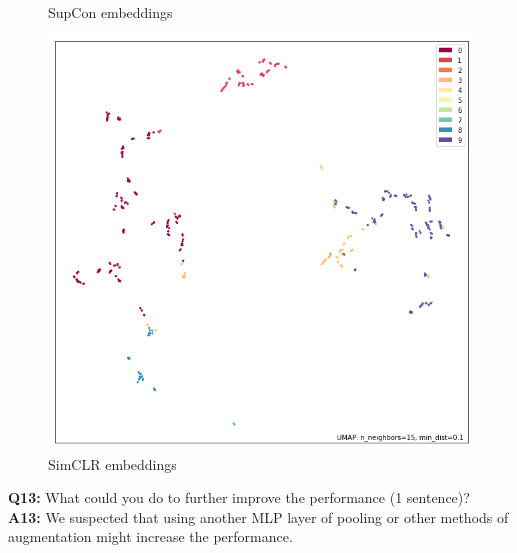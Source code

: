 \documentclass{article}
\begin{document}
\begin{figure}[H]
\begin{minipage}[b]{0.33\linewidth}
            \caption{SupCon embeddings}
            \label{fig:figure 1.2}
        \end{minipage}
        \begin{minipage}[b]{0.33\linewidth}
            \centering
            \includegraphics[width=\textwidth]{../results/simclr_64.png}
            \caption{SimCLR embeddings}
            \label{fig:figure 1.3}
        \end{minipage}

    \end{figure}

    

    \textbf{Q13:} What could you do to further improve the performance (1 sentence)?\\
    \textbf{A13:} We suspected that using another MLP layer of pooling or other methods of augmentation might increase the performance.
\end{document}
